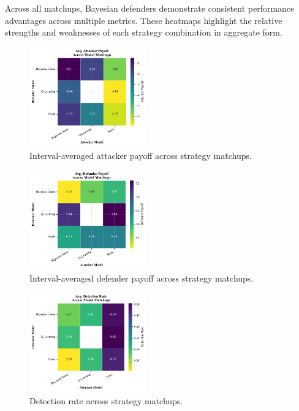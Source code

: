 \documentclass[conference]{IEEEtran}
\begin{document}
Across all matchups, Bayesian defenders demonstrate consistent performance advantages across multiple metrics. These heatmaps highlight the relative strengths and weaknesses of each strategy combination in aggregate form.

\begin{figure}[htbp]
  \centering
  \includegraphics[width=0.45\textwidth]{fig_atk_payoff_heatmap.pdf}
  \caption{Interval-averaged attacker payoff across strategy matchups.}
  \label{fig:atk_payoff_heatmap}
\end{figure}

\begin{figure}[htbp]
  \centering
  \includegraphics[width=0.45\textwidth]{fig_def_payoff_heatmap.pdf}
  \caption{Interval-averaged defender payoff across strategy matchups.}
  \label{fig:def_payoff_heatmap}
\end{figure}

\begin{figure}[htbp]
  \centering
  \includegraphics[width=0.45\textwidth]{fig_detection_heatmap.pdf}
  \caption{Detection rate across strategy matchups.}
  \label{fig:detection_heatmap}
\end{figure}
\end{document}
